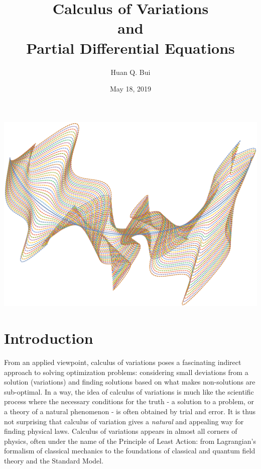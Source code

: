 \documentclass{article}
\title{Calculus of Variations\\and\\Partial Differential Equations}
\author{Huan Q. Bui}
\date{May 18, 2019}
\begin{document}
\maketitle
\begin{center}
\includegraphics[scale=0.55,angle=270]{intro.eps}\\
\end{center}



\newpage
\tableofcontents
\newpage
{}





\section{Introduction}

\noindent From an applied viewpoint, calculus of variations poses a fascinating indirect approach to solving optimization problems: considering small deviations from a solution (variations) and finding solutions based on what makes non-solutions are sub-optimal. In a way, the idea of calculus of variations is much like the scientific process where the necessary conditions for the truth - a solution to a problem, or a theory of a natural phenomenon - is often obtained by trial and error. It is thus not surprising that calculus of variation gives a \textit{natural} and appealing way for finding physical laws. Calculus of variations appears in almost all corners of physics, often under the name of the Principle of Least Action: from Lagrangian's formalism of classical mechanics to the foundations of classical and quantum field theory and the Standard Model.\\
\end{document}
